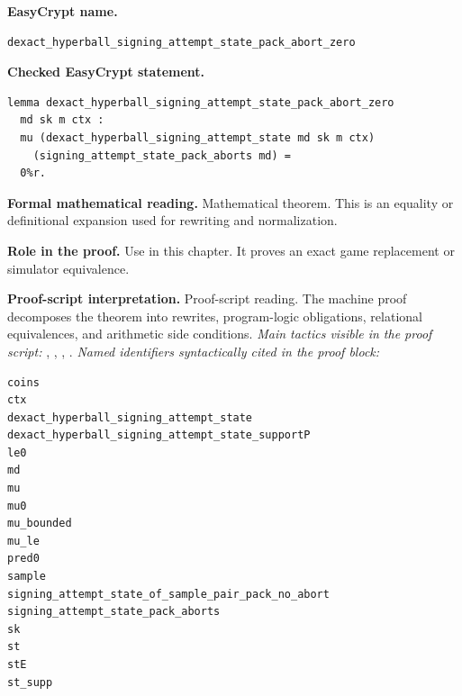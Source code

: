 \begin{formaltheorem}
\noindent\textbf{EasyCrypt name.}
\begin{lstlisting}[language=EasyCrypt,basicstyle=\ttfamily\scriptsize]
dexact_hyperball_signing_attempt_state_pack_abort_zero
\end{lstlisting}
\noindent\textbf{Checked EasyCrypt statement.}
\begin{lstlisting}[language=EasyCrypt,basicstyle=\ttfamily\scriptsize]
lemma dexact_hyperball_signing_attempt_state_pack_abort_zero
  md sk m ctx :
  mu (dexact_hyperball_signing_attempt_state md sk m ctx)
    (signing_attempt_state_pack_aborts md) =
  0%r.
\end{lstlisting}
\noindent\textbf{Formal mathematical reading.}
Mathematical theorem. This is an equality or definitional expansion used for rewriting and normalization.

\noindent\textbf{Role in the proof.}
Use in this chapter. It proves an exact game replacement or simulator equivalence.

\noindent\textbf{Proof-script interpretation.}
Proof-script reading. The machine proof decomposes the theorem into rewrites, program-logic obligations, relational equivalences, and arithmetic side conditions.
\emph{Main tactics visible in the proof script:} , , , .
\emph{Named identifiers syntactically cited in the proof block:}
\begin{lstlisting}[language=EasyCrypt,basicstyle=\ttfamily\scriptsize]
coins
ctx
dexact_hyperball_signing_attempt_state
dexact_hyperball_signing_attempt_state_supportP
le0
md
mu
mu0
mu_bounded
mu_le
pred0
sample
signing_attempt_state_of_sample_pair_pack_no_abort
signing_attempt_state_pack_aborts
sk
st
stE
st_supp
\end{lstlisting}

\end{formaltheorem}

